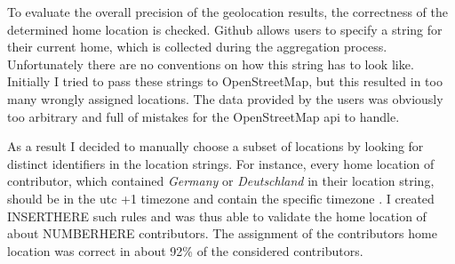 To evaluate the overall precision of the geolocation results, the correctness of the determined home location is checked.
Github allows users to specify a string for their current home, which is collected during the aggregation process.
Unfortunately there are no conventions on how this string has to look like.
Initially I tried to pass these strings to OpenStreetMap, but this resulted in too many wrongly assigned locations.
The data provided by the users was obviously too arbitrary and full of mistakes for the OpenStreetMap \ac{api} to handle.

As a result I decided to manually choose a subset of locations by looking for distinct identifiers in the location strings.
For instance, every home location of contributor, which contained \emph{Germany} or \emph{Deutschland} in their location string, should be in the \ac{utc} +1 timezone and contain the specific timezone .
I created INSERTHERE such rules and was thus able to validate the home location of about NUMBERHERE contributors.
The assignment of the contributors home location was correct in about 92\% of the considered contributors.


